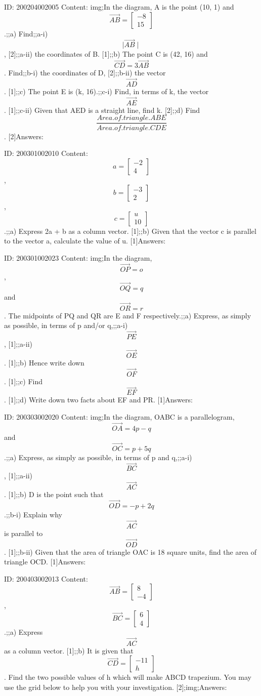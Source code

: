 \documentclass{article}
\begin{document}
ID: 200204002005
Content:
img;In the diagram, A is the point (10, 1) and $$\vec{AB} = \begin{bmatrix}-8\\15\end{bmatrix}$$.;;a) Find;;a-i) $$\mid\vec{AB}\mid$$, [2];;a-ii) the coordinates of B.   [1];;b) The point C is (42, 16) and $$\vec{CD} = 3\vec{AB}$$. Find;;b-i) the coordinates of D,   [2];;b-ii) the vector $$\vec{AD}$$.   [1];;c) The point E is (k, 16).;;c-i) Find, in terms of k, the vector $$\vec{AE}$$.   [1];;c-ii) Given that AED is a straight line, find k.   [2];;d) Find $$\frac{Area.of.triangle.ABE}{Area.of.triangle.CDE}$$.     [2]Answers:

ID: 200301002010
Content:
$$a=\begin{bmatrix}-2\\4\end{bmatrix}$$, $$b=\begin{bmatrix}-3\\2\end{bmatrix}$$, $$c=\begin{bmatrix}u\\10\end{bmatrix}$$.;;a) Express 2a + b as a column vector. [1];;b) Given that the vector c is parallel to the vector a, calculate the value of u. [1]Answers:

ID: 200301002023
Content:
img;In the diagram, $$\vec{OP}=o$$, $$\vec{OQ}=q$$ and $$\vec{OR}=r$$. The midpoints of PQ and QR are E and F respectively.;;a) Express, as simply as possible, in terms of p and/or q,;;a-i) $$\vec{PE}$$, [1];;a-ii) $$\vec{OE}$$. [1];;b) Hence write down $$\vec{OF}$$. [1];;c) Find $$\vec{EF}$$. [1];;d) Write down two facts about EF and PR. [1]Answers:

ID: 200303002020
Content:
img;In the diagram, OABC is a parallelogram, $$\vec{OA} = 4p - q$$ and $$\vec{OC} = p+5q$$.;;a) Express, as simply as possible, in terms of p and q,;;a-i) $$\vec{BC}$$,   [1];;a-ii) $$\vec{AC}$$.   [1];;b) D is the point such that $$\vec{OD} = -p + 2q$$.;;b-i) Explain why $$\vec{AC}$$ is parallel to $$\vec{OD}$$.   [1];;b-ii) Given that the area of triangle OAC is 18 square units, find the area of triangle OCD.   [1]Answers:

ID: 200403002013
Content:
$$\vec{AB}= \begin{bmatrix}8\\-4\end{bmatrix}$$, $$\vec{BC}=\begin{bmatrix}6\\4\end{bmatrix}$$.;;a) Express $$\vec{AC}$$ as a column vector. [1];;b) It is given that $$\vec{CD}=\begin{bmatrix}-11\\h\end{bmatrix}$$. Find the two possible values of h which will make ABCD trapezium. You may use the grid below to help you with your investigation. [2];img;Answers:
\end{document}
